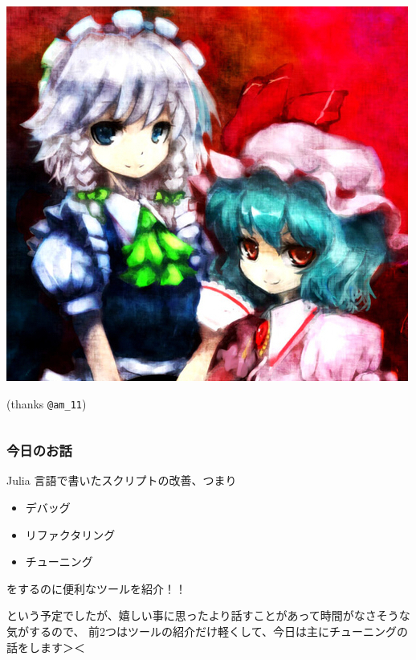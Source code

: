 \documentclass[dvipdfmx]{beamer}
\begin{document}
\begin{frame}[containsverbatim]
\begin{columns}
\begin{column}{.3\linewidth}
  \includegraphics[width=\linewidth]{sakuremi.jpg}

  (thanks \verb|@am_11|)
\end{column}
  \end{columns}
\end{frame}

\begin{frame}
  \frametitle{今日のお話}
  Julia 言語で書いたスクリプトの改善、つまり
  \begin{itemize}
    \item デバッグ
    \item リファクタリング
    \item チューニング
  \end{itemize}
  をするのに便利なツールを紹介！！

  という予定でしたが、嬉しい事に思ったより話すことがあって時間がなさそうな気がするので、
  前2つはツールの紹介だけ軽くして、今日は主にチューニングの話をします＞＜
  \onslide
\end{frame}




\end{document}
